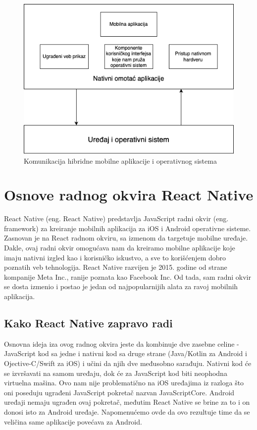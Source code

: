 \documentclass[12pt,oneside]{memoir}
\begin{document}
\begin{figure}[h]
    \centering
    \includegraphics[scale=0.5]{docs/images/chapterTwo/hibridnaMobilnaAplikacija.png}
    \caption{Komunikacija hibridne mobilne aplikacije i operativnog sistema}
    \label{fig:hibridnaMobilnaAplikacija}
\end{figure}

\chapter{Osnove radnog okvira React Native}

React Native (eng. React Native) predstavlja JavaScript radni okvir (eng. framework) za kreiranje mobilnih aplikacija za iOS i Android operativne sisteme. Zasnovan je na React radnom okviru, sa izmenom da targetuje mobilne uređaje. Dakle, ovaj radni okvir omogućava nam da kreiramo mobilne aplikacije koje imaju nativni izgled kao i korisničko iskustvo, a sve to korišćenjem dobro poznatih veb tehnologija. React Native razvijen je 2015. godine od strane kompanije Meta Inc., ranije poznata kao Facebook Inc. Od tada, sam radni okvir se dosta izmenio i postao je jedan od najpopularnijih alata za ravoj mobilnih aplikacija.

\section{Kako React Native zapravo radi}

Osnovna ideja iza ovog radnog okvira jeste da kombinuje dve zasebne celine - JavaScript kod sa jedne i nativni kod sa druge strane (Java/Kotlin za Android i Ojective-C/Swift za iOS) i učini da njih dve međusobno sarađuju. Nativni kod će se izvršavati na samom uređaju, dok će za JavaScript kod biti neophodna virtuelna mašina. Ovo nam nije problematično na iOS uređajima iz razloga što oni poseduju ugrađeni JavaScript pokretač nazvan JavaScriptCore. Android uređaji nemaju ugrađen ovaj pokretač, međutim React Native se brine za to i on donosi isto za Android uređaje. Napomenućemo ovde da ovo rezultuje time da se veličina same aplikacije povećava za Android.
\end{document}
